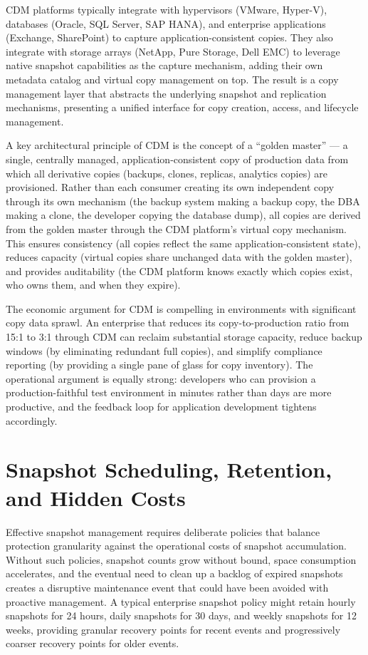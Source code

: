 CDM platforms typically integrate with hypervisors (VMware, Hyper-V), databases (Oracle, SQL Server, SAP HANA), and enterprise applications (Exchange, SharePoint) to capture application-consistent copies. They also integrate with storage arrays (NetApp, Pure Storage, Dell EMC) to leverage native snapshot capabilities as the capture mechanism, adding their own metadata catalog and virtual copy management on top. The result is a copy management layer that abstracts the underlying snapshot and replication mechanisms, presenting a unified interface for copy creation, access, and lifecycle management.

A key architectural principle of CDM is the concept of a ``golden master'' --- a single, centrally managed, application-consistent copy of production data from which all derivative copies (backups, clones, replicas, analytics copies) are provisioned. Rather than each consumer creating its own independent copy through its own mechanism (the backup system making a backup copy, the DBA making a clone, the developer copying the database dump), all copies are derived from the golden master through the CDM platform's virtual copy mechanism. This ensures consistency (all copies reflect the same application-consistent state), reduces capacity (virtual copies share unchanged data with the golden master), and provides auditability (the CDM platform knows exactly which copies exist, who owns them, and when they expire).

The economic argument for CDM is compelling in environments with significant copy data sprawl. An enterprise that reduces its copy-to-production ratio from 15:1 to 3:1 through CDM can reclaim substantial storage capacity, reduce backup windows (by eliminating redundant full copies), and simplify compliance reporting (by providing a single pane of glass for copy inventory). The operational argument is equally strong: developers who can provision a production-faithful test environment in minutes rather than days are more productive, and the feedback loop for application development tightens accordingly.

\section{Snapshot Scheduling, Retention, and Hidden Costs}

Effective snapshot management requires deliberate policies that balance protection granularity against the operational costs of snapshot accumulation. Without such policies, snapshot counts grow without bound, space consumption accelerates, and the eventual need to clean up a backlog of expired snapshots creates a disruptive maintenance event that could have been avoided with proactive management. A typical enterprise snapshot policy might retain hourly snapshots for 24 hours, daily snapshots for 30 days, and weekly snapshots for 12 weeks, providing granular recovery points for recent events and progressively coarser recovery points for older events.

